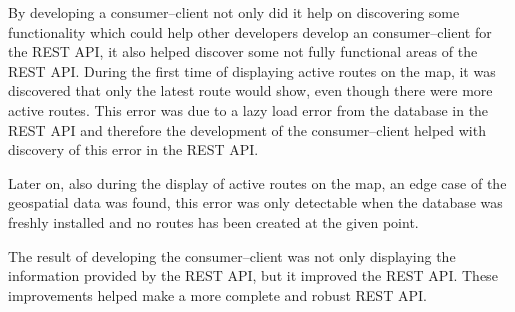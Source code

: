 \bigskip
By developing a consumer--client not only did it help on discovering some functionality which could help other developers develop an consumer--client for the REST API, it also helped discover some not fully functional areas of the REST API.
During the first time of displaying active routes on the map, it was discovered that only the latest route would show, even though there were more active routes.
This error was due to a lazy load error from the database in the REST API and therefore the development of the consumer--client helped with discovery of this error in the REST API.

Later on, also during the display of active routes on the map, an edge case of the geospatial data was found, this error was only detectable when the database was freshly installed and no routes has been created at the given point.

\bigskip
The result of developing the consumer--client was not only displaying the information provided by the REST API, but it improved the REST API.
These improvements helped make a more complete and robust REST API.
